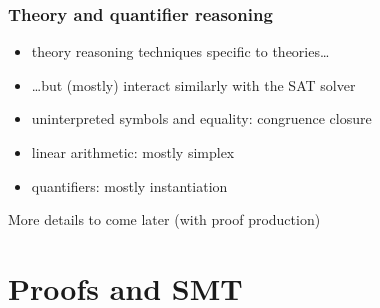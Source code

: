 \documentclass[svgnames,table,mathserif]{beamer}
\begin{document}

\begin{frame}
  \frametitle{Theory and quantifier reasoning}

  \begin{itemize}
  \item theory reasoning techniques specific to theories\dots
  \item \dots but (mostly) interact similarly with the SAT solver
  \item uninterpreted symbols and equality: congruence closure
  \item linear arithmetic: mostly simplex
  \item quantifiers: mostly instantiation
  \end{itemize}

  More details to come later (with proof production)

\end{frame}


\section{Proofs and SMT}

\end{document}
